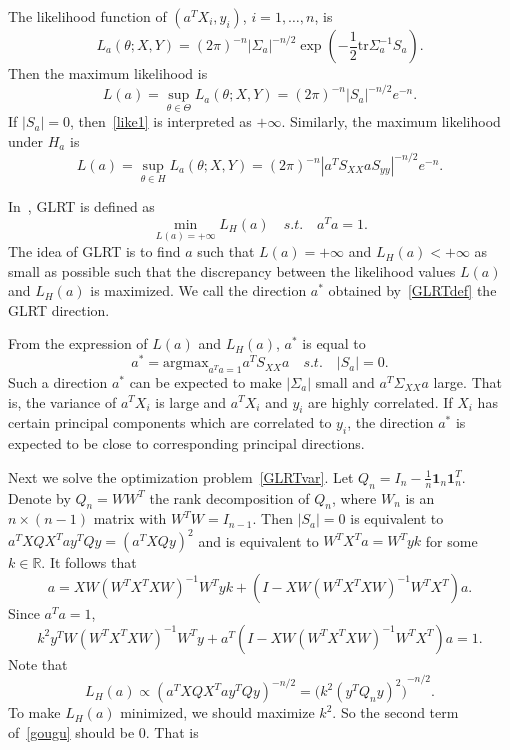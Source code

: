 \documentclass[review]{elsarticle}
\theoremstyle{plain}
\theoremstyle{definition}
\theoremstyle{remark}
\begin{document}
     The likelihood function of $(a^T X_i,y_i)$, $i=1,\ldots,n$,  is 
\begin{equation*}
L_a(\theta;X,Y)={(2\pi)}^{-n}|\Sigma_a|^{-n/2}\exp{(-\frac{1}{2}\textrm{tr}\Sigma_a^{-1}S_a)}.
\end{equation*}
Then the maximum likelihood is
    \begin{equation}\label{like1}
        L(a)=\sup_{\theta\in \Theta}L_a(\theta ;X,Y)={(2\pi)}^{-n} |S_a|^{-n/2}e^{-n}.
\end{equation}
    If $|S_a|=0$, then~\ref{like1} is interpreted as $+\infty$.
    Similarly, the maximum likelihood under $H_a$ is
\begin{equation*}
    L(a)=\sup_{\theta\in H}L_a(\theta ;X,Y)={(2\pi)}^{-n} |a^T S_{XX}aS_{yy}|^{-n/2}e^{-n}.
\end{equation*}

    In~\cite{Zhao2016A}, GLRT is defined as
    \begin{equation} \label{GLRTdef}
        \min_{L(a)=+\infty} L_H(a)\quad s.t.\quad a^T a=1.
    \end{equation}
    The idea of GLRT is to find $a$ such that $L(a)=+\infty$ and $L_{H}(a)<+\infty$ as small as possible such that the discrepancy between the likelihood values $L(a)$ and $L_H (a)$ is maximized. We call the direction $a^*$ obtained  by~\eqref{GLRTdef} the GLRT direction.
    
    From the expression of $L(a)$ and $L_H(a)$,  $a^*$ is equal to%
    \begin{equation} \label{GLRTvar}
        a^*=\textrm{argmax}_{a^T a=1} a^T S_{XX} a \quad s.t.\quad |S_a|=0.
    \end{equation}
    Such a direction $a^*$ can be expected to make $|\Sigma_a|$ small and $a^T \Sigma_{XX} a$ large.
    That is, the variance of $a^T X_i$ is large and $a^T X_i$ and $y_i$ are highly correlated.
    If $X_i$ has certain principal components which are correlated to $y_i$, the direction $a^*$ is expected to be close to corresponding principal directions.


    Next we solve the optimization problem~\eqref{GLRTvar}. Let $Q_n=I_n-\frac{1}{n}\textbf{1}_n\textbf{1}_n^T$. Denote by $Q_n=WW^T$ the rank decomposition of $Q_n$, where $W_n$ is an $n\times (n-1)$ matrix with $W^T W=I_{n-1}$. 
    Then $|S_a|=0$ is equivalent to $a^T X Q X^T a y^T Q y={(a^T X Q y)}^2$ and is equivalent to $W^T X^T a=W^T y k$ for some $k\in \mathbb{R}$. It follows that
    \begin{equation*}
        a=XW{(W^T X^T X W)}^{-1} W^T y k + (I-XW{(W^T X^T X W)}^{-1}W^T X^T)a.
    \end{equation*}
Since $a^T a=1$,
    \begin{equation}\label{gougu}
        k^2 y^T W{(W^T X^T X W)}^{-1} W^T y + a^T(I-XW{(W^T X^T X W)}^{-1}W^T X^T)a=1.
    \end{equation}
Note that 
    \begin{equation*}
        L_H (a)\propto {(a^T X Q X^T a y^T Q y)}^{-n/2}={\big(k^2{(y^T Q_n y)}^2\big)}^{-n/2}.
    \end{equation*}
    To make $L_H(a)$ minimized, we should maximize $k^2$. So the second term of~\ref{gougu} should be $0$. That is
\end{document}
